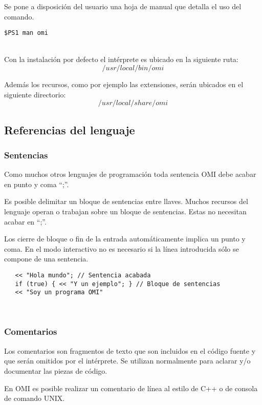 Se pone a disposición del usuario una hoja de manual que detalla el uso del comando.\\
\begin{lstlisting}
$PS1 man omi
\end{lstlisting}
\hfill\\

Con la instalación por defecto el intérprete es ubicado en la siguiente ruta:
$$/usr/local/bin/omi$$

Además los recursos, como por ejemplo las extensiones, serán ubicados en el siguiente directorio:
$$/usr/local/share/omi$$

\lstset {language=omi}
\subsection{Referencias del lenguaje}
\subsubsection{Sentencias} \label{sec:stmt}
Como muchos otros lenguajes de programación toda sentencia OMI debe acabar en punto y coma ``;''. 

Es posible delimitar un bloque de sentencias entre llaves. Muchos recursos del lenguaje operan 
 o trabajan sobre un bloque de sentencias. Estas no necesitan acabar en ``;''.

Los cierre de bloque o fin de la entrada automáticamente implica un punto y coma.
En el modo interactivo no es necesario si la línea introducida sólo se compone de una sentencia. \\

\begin{lstlisting}
   << "Hola mundo"; // Sentencia acabada 
   if (true) { << "Y un ejemplo"; } // Bloque de sentencias 
   << "Soy un programa OMI"
\end{lstlisting}
\hfill\\

\subsubsection{Comentarios}\label{sec:comments}
Los comentarios son fragmentos de texto que son incluidos en el código fuente y que serán omitidos por el intérprete. Se utilizan normalmente para aclarar y/o documentar las
piezas de código. 

En OMI es posible realizar un comentario de línea al estilo de C++ o de consola de comando UNIX. \\

